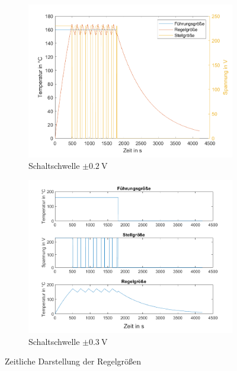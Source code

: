 \documentclass[
    paper=a4,
    fontsize=10pt,
    DIV=12,
    oneside,
]{scrartcl}
\begin{document}
    \begin{figure}[hbt]
        \centering
        \begin{subfigure}{0.49\columnwidth}
            \includegraphics[width=1.0\columnwidth]{../versuch1/tempregler_plot.png}
            \caption{Schaltschwelle \(\pm\SI{0.2}{\volt}\)}
            \label{fig:tempregler_plot}   
        \end{subfigure}%
        \hfill%
        \begin{subfigure}{0.49\columnwidth}
            \includegraphics[width=1.0\columnwidth]{../versuch1/tempregler_plot_new.png}
            \caption{Schaltschwelle \(\pm\SI{0.3}{\volt}\)}
            \label{fig:tempregler_plot_new}
        \end{subfigure}
        \caption{Zeitliche Darstellung der Regelgrößen}
    \end{figure}
\end{document}
